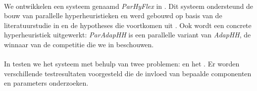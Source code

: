 \paragraph{}
We ontwikkelen een systeem genaamd \emph{ParHyFlex} in . Dit systeem ondersteund de bouw van parallelle hyperheuristieken en werd gebouwd op basis van de literatuurstudie in  en de hypotheses die voortkomen uit . Ook wordt een concrete hyperheuristiek uitgewerkt: \emph{ParAdapHH} is een parallelle variant van \emph{AdapHH}, de winnaar van de competitie die we in  beschouwen.

\paragraph{}
In  testen we het systeem met behulp van twee problemen:  en het . Er worden verschillende testresultaten voorgesteld die de invloed van bepaalde componenten en parameters onderzoeken.



